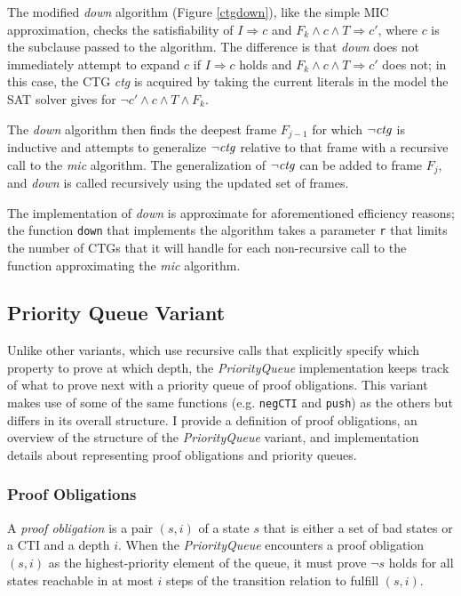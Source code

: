 \documentclass[12pt,a4paper,twoside,openright]{report}
\begin{document}
{{The modified {\it down} algorithm (Figure \ref{ctgdown}), like the simple MIC approximation,
checks the satisfiability of
$I \Rightarrow c$ and $F_k \wedge c \wedge T \Rightarrow c'$, where $c$ is the subclause passed to
the algorithm.
The difference is that {\it down} does not immediately attempt to expand $c$
if $I \Rightarrow c$ holds and $F_k \wedge c \wedge T \Rightarrow c'$ does
not; in this case, the CTG {\it ctg} is acquired by taking the current literals in
the model the SAT solver gives for $\neg c' \wedge c \wedge T \wedge F_k$.

The {\it down} algorithm then finds the deepest frame $F_{j - 1}$ for which $\neg {\it ctg}$ is inductive
and attempts to generalize $\neg {\it ctg}$ relative to that frame with a recursive call to the
{\it mic} algorithm. The generalization of $\neg {\it ctg}$ can be added to frame $F_j$,
and {\it down} is called recursively using the updated set of frames.

The implementation of {\it down} is approximate for aforementioned efficiency
reasons; the function \verb,down, that implements
the algorithm takes a parameter \verb,r, that limits the number of CTGs that it will handle for
each non-recursive call to the function approximating the {\it mic} algorithm.

\subsection{Priority Queue Variant}
\label{pqueue}
Unlike other variants, which use recursive calls that explicitly specify which property
to prove at which depth, the \emph{PriorityQueue} implementation keeps track of what
to prove next with a priority queue of proof obligations.
This variant makes
use of some of the same functions (e.g. \verb,negCTI, and \verb,push,) as the others but
differs in its overall structure.
I provide a definition of proof obligations, an
overview of the structure of the \emph{PriorityQueue} variant,
and implementation details about representing proof obligations and priority queues.

\subsubsection{Proof Obligations}
A \emph{proof obligation} is a pair $(s,i)$ of a state $s$ that is either a set of bad states
or a CTI and a depth $i$. When the \emph{PriorityQueue} encounters a proof obligation
$(s,i)$ as the highest-priority element of the queue, it must prove $\neg s$ holds for all states
reachable in at most $i$ steps of the transition relation to fulfill
$(s, i)$.

}}
\end{document}
